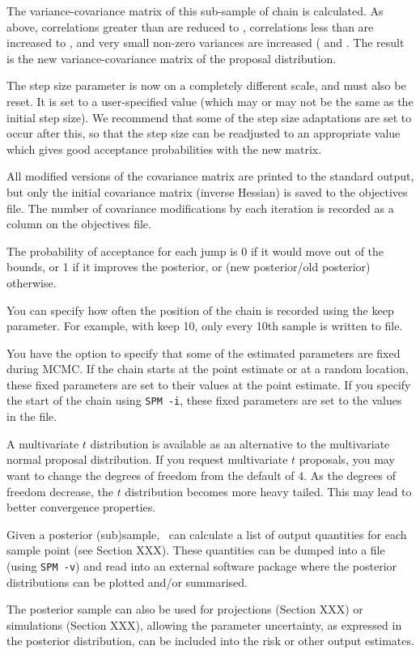 The variance-covariance matrix of this sub-sample of chain is calculated. As above, correlations greater than  are reduced to , correlations less than  are increased to  , and very small non-zero variances are increased ( and . The result is the new variance-covariance matrix of the proposal distribution.

The step size parameter is now on a completely different scale, and must also be reset. It is set to a user-specified value (which may or may not be the same as the initial step size). We recommend that some of the step size adaptations are set to occur after this, so that the step size can be readjusted to an appropriate value which gives good acceptance probabilities with the new matrix. 

All modified versions of the covariance matrix are printed to the standard output, but only the initial covariance matrix (inverse Hessian) is saved to the objectives file. The number of covariance modifications by each iteration is recorded as a column on the objectives file. 

The probability of acceptance for each jump is 0 if it would move out of the bounds, or 1 if it improves the posterior, or (new posterior/old posterior) otherwise. 

You can specify how often the position of the chain is recorded using the keep parameter. For example, with keep 10, only every 10th sample is written to file. 

You have the option to specify that some of the estimated parameters are fixed during MCMC. If the chain starts at the point estimate or at a random location, these fixed parameters are set to their values at the point estimate. If you specify the start of the chain using \texttt{SPM -i}, these fixed parameters are set to the values in the file.

A multivariate $t$ distribution is available as an alternative to the multivariate normal proposal distribution. If you request multivariate $t$ proposals, you may want to change the degrees of freedom from the default of 4. As the degrees of freedom decrease, the $t$ distribution becomes more heavy tailed. This may lead to better convergence properties.

Given a posterior (sub)sample, \SPM\ can calculate a list of output quantities for each sample point (see Section XXX). These quantities can be dumped into a file (using \texttt{SPM -v}) and read into an external software package where the posterior distributions can be plotted and/or summarised. 

The posterior sample can also be used for projections (Section XXX) or simulations (Section XXX), allowing the parameter uncertainty, as expressed in the posterior distribution, can be included into the risk or other output estimates.

